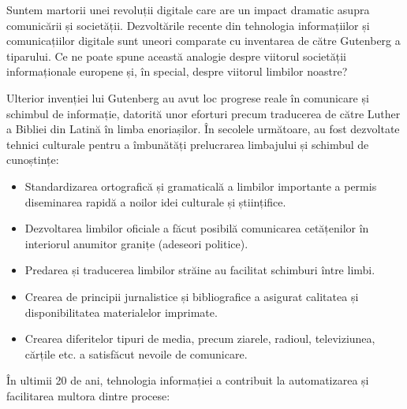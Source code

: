 \documentclass[]{../../metanetpaper}
\begin{document}
\begin{multicols}{2}
Suntem martorii unei revoluții digitale care are un impact dramatic asupra comunicării și societății. Dezvoltările recente din tehnologia informațiilor și comunicațiilor digitale sunt uneori comparate cu inventarea de către Gutenberg a tiparului. Ce ne poate spune această analogie despre viitorul societății informaționale europene și, în special, despre viitorul limbilor noastre?


Ulterior invenției lui Gutenberg au avut loc progrese reale în comunicare și schimbul de informație, datorită unor eforturi precum traducerea de către Luther a Bibliei din Latină în limba enoriașilor. În secolele următoare, au fost dezvoltate tehnici culturale pentru a îmbunătăți prelucrarea limbajului și schimbul de cunoștințe:

\medskip
\begin{itemize}
\item Standardizarea ortografică și gramaticală a limbilor importante a permis diseminarea rapidă a noilor idei culturale și științifice.
\item Dezvoltarea limbilor oficiale a făcut posibilă comunicarea cetățenilor în interiorul anumitor granițe (adeseori politice).
\item Predarea și traducerea limbilor străine au facilitat schimburi între limbi.
\item Crearea de principii jurnalistice și bibliografice a asigurat calitatea și disponibilitatea materialelor imprimate.
\medskip
\item Crearea diferitelor tipuri de media, precum ziarele, radioul, televiziunea, cărțile etc. a satisfăcut nevoile de comunicare.
\end{itemize}

În ultimii 20 de ani, tehnologia informației a contribuit la automatizarea și facilitarea multora dintre procese:


\end{multicols}
\end{document}
